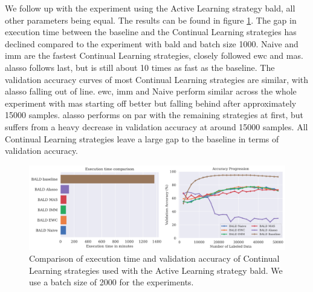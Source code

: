 We follow up with the experiment using the Active Learning strategy \gls{bald}, all other parameters being equal. The results can be found in figure \ref{fig:Evaluation:Results:CAL:BALD2000}. The gap in
execution time between the baseline and the Continual Learning strategies has declined compared to the experiment with \gls{bald} and batch size 1000. Naive and \gls{imm} are the fastest Continual Learning strategies,
closely followed \gls{ewc} and \gls{mas}. \gls{alasso} follows last, but is still about 10 times as fast as the baseline. The validation accuracy curves of most Continual Learning strategies are similar, with \gls{alasso} falling 
out of line. \gls{ewc}, \gls{imm} and Naive perform similar across the whole experiment with \gls{mas} starting off better but falling behind after approximately 15000 samples. \gls{alasso} performs on par with the remaining strategies
at first, but suffers from a heavy decrease in validation accuracy at around 15000 samples. All Continual Learning strategies leave a large gap to the baseline in terms of validation accuracy. \par

\begin{figure}[h]
    \centering
    \includegraphics[width=\linewidth]{images/results_CAL/Bald_CAL_2000b.png}
    \caption[Continual Active Learning \gls{bald} 2000 batch size]{Comparison of execution time and validation accuracy of Continual Learning strategies used with the Active Learning strategy
    \gls{bald}. We use a batch size of 2000 for the experiments.}
    \label{fig:Evaluation:Results:CAL:BALD2000}
\end{figure}

